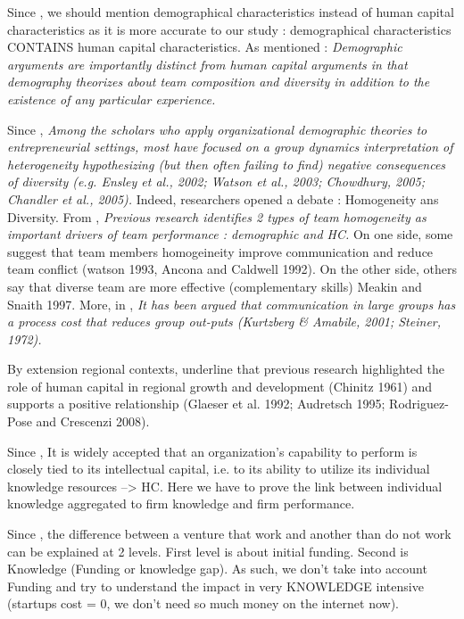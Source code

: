 Since \citet{beckman2007early}, we should mention demographical characteristics instead of human capital characteristics as it is more accurate to our study : demographical characteristics CONTAINS human capital characteristics. As mentioned : \textit{Demographic arguments are importantly distinct from human capital arguments in that demography theorizes about team composition and diversity in addition to the existence of any particular experience.}

Since \citet{beckman2007early}, \textit{Among the scholars who apply organizational demographic theories to entrepreneurial settings, most have focused on a group dynamics interpretation of heterogeneity hypothesizing (but then often failing to find) negative consequences of diversity (e.g. Ensley et al., 2002; Watson et al., 2003; Chowdhury, 2005; Chandler et al., 2005).} Indeed, researchers opened a debate : Homogeneity ans Diversity. From \citep{steffens2012birds}, \textit{Previous research identifies 2 types of team homogeneity as important drivers of team performance : demographic and HC.} On one side, some suggest that team members homogeineity improve communication and reduce team conflict (watson 1993, Ancona and Caldwell 1992). On the other side, others say that diverse team are more effective (complementary skills) Meakin and Snaith 1997. More, in \citet{taylor2006superman}, \textit{It has been argued that communication in large groups has a process cost that reduces group out-puts (Kurtzberg & Amabile, 2001; Steiner, 1972).}\newline

By extension regional contexts, \citep{audretsch2015entrepreneurship} underline that previous research highlighted the role of human capital in regional growth and development (Chinitz 1961) and supports a positive relationship (Glaeser et al. 1992; Audretsch 1995; Rodriguez-Pose and Crescenzi 2008).

Since \citet{andries2014small}, It is widely accepted that an organization’s capability to perform is closely tied to its intellectual capital, i.e. to its ability to utilize its individual knowledge resources --> HC. Here we have to prove the link between individual knowledge aggregated to firm knowledge and firm performance.

Since \citet{colombo2005founders}, the difference between a venture that work and another than do not work can be explained at 2 levels. First level is about initial funding. Second is Knowledge (Funding or knowledge gap). As such, we don't take into account Funding and try to understand the impact in very KNOWLEDGE intensive (startups cost = 0, we don't need so much money on the internet now).

